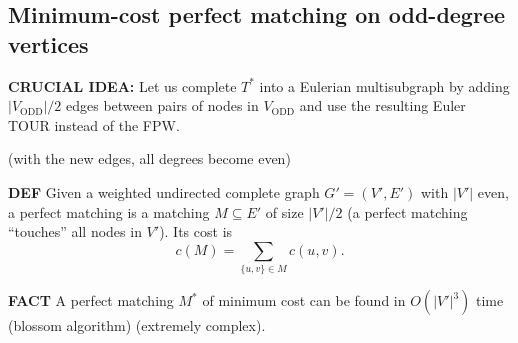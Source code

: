 \subsection{Minimum-cost perfect matching on odd-degree vertices}
\textbf{CRUCIAL IDEA:} Let us complete $T^*$ into a Eulerian multisubgraph by adding $|V_{\mathrm{ODD}}|/2$ edges between pairs of nodes in $V_{\mathrm{ODD}}$ and use the resulting Euler TOUR instead of the FPW.

(with the new edges, all degrees become even)
\begin{notesdefinition}
\textbf{DEF} Given a weighted undirected complete graph $G'=(V',E')$ with $|V'|$ even, a perfect matching is a matching $M\subseteq E'$ of size $|V'|/2$ (a perfect matching ``touches'' all nodes in $V'$). Its cost is
\[c(M)=\sum_{\{u,v\}\in M}c(u,v).\]
\end{notesdefinition}
\begin{notesresult}
\textbf{FACT} A perfect matching $M^*$ of minimum cost can be found in $O(|V'|^3)$ time (blossom algorithm) (extremely complex).
\end{notesresult}

